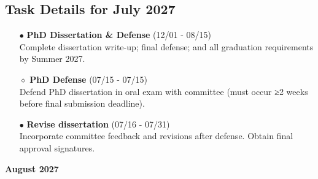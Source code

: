 \documentclass[landscape,a4paper]{article}
\begin{document}
\subsection{Task Details for July 2027}
\begin{itemize}[leftmargin=1cm]
    \item[\textcolor{other}{$\bullet$}] \textbf{PhD Dissertation \& Defense} (12/01 - 08/15)\\ Complete dissertation write-up; final defense; and all graduation requirements by Summer 2027.
    \item[\textcolor{other}{$\diamond$}] \textbf{PhD Defense} (07/15 - 07/15)\\ Defend PhD dissertation in oral exam with committee (must occur ≥2 weeks before final submission deadline).
    \item[\textcolor{other}{$\bullet$}] \textbf{Revise dissertation} (07/16 - 07/31)\\ Incorporate committee feedback and revisions after defense. Obtain final approval signatures.
\end{itemize}

\newpage
\pagestyle{empty}

\begin{center}
{\large\textbf{August 2027}}
\end{center}

\vspace{0.5cm}
\end{document}

